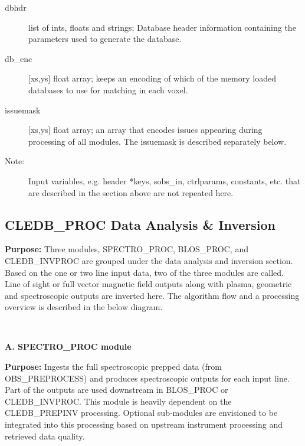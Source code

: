 \documentclass{article}
\begin{document}
\begin{description}
     \item[dbhdr]
        list of ints, floats and strings; Database header information containing the parameters used to generate the database.  
     \item[db\_enc]
        [xs,ys] float array; keeps an encoding of which of the memory loaded databases to use for matching in each voxel.          
    \item[issuemask]
        [xs,ys] float array; an array that encodes issues appearing during processing of all modules. The issuemask is described separately below.        
      \item[Note:]
       Input variables, e.g. header *keys, sobs\_in, ctrlparams, constants, etc. that are described in the section above are not repeated here.                                  
\end{description}


\newpage
\subsection*{\Large CLEDB\_PROC Data Analysis \& Inversion}

\textbf{Purpose:} Three modules, SPECTRO\_PROC, BLOS\_PROC, and CLEDB\_INVPROC are grouped under the data analysis and inversion section. Based on the one or two line input data, two of the three modules are called. Line of sight or full vector magnetic field outputs along with plasma, geometric and spectroscopic outputs are inverted here. The algorithm flow and a processing overview is described in the below diagram. 

~

\textbf{A. SPECTRO\_PROC module}

\textbf{Purpose:} Ingests the full spectroscopic prepped data (from OBS\_PREPROCESS) and produces spectroscopic outputs for each input line. Part of the outputs are used downstream in BLOS\_PROC or CLEDB\_INVPROC. This module is heavily dependent on the CLEDB\_PREPINV processing.  Optional sub-modules are envisioned to be integrated into this processing based on upstream instrument processing and retrieved data quality.

~
\end{document}
